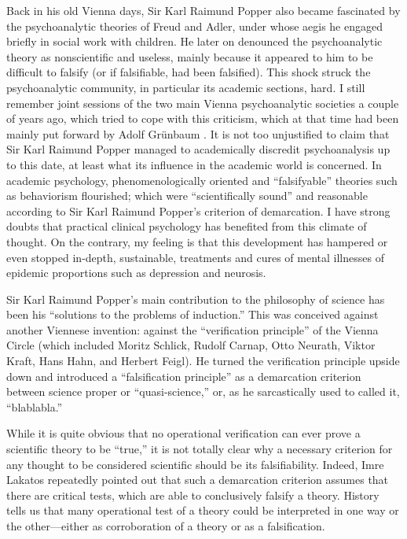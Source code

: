 Back in his old Vienna days, Sir Karl Raimund Popper
also became fascinated by the psychoanalytic theories of Freud and Adler,
under whose aegis he engaged briefly in social work with children.
He later on denounced the psychoanalytic theory as nonscientific and useless,
mainly because it appeared to him to be difficult to falsify (or if
falsifiable, had been falsified).
This shock struck the psychoanalytic community, in particular its academic sections, hard.
I still remember joint sessions of the two main Vienna psychoanalytic societies
a couple of years ago,
which tried to cope with this criticism, which at that time had been mainly put
forward by Adolf Gr\"unbaum \cite{gruenbaum-psychoanalysis}.
It is not too unjustified to claim that Sir Karl Raimund Popper managed to academically discredit
psychoanalysis up to this date, at least what its influence in the
academic world is concerned.
In academic psychology, phenomenologically oriented and ``falsifyable''
theories such as behaviorism flourished;
 which were ``scientifically sound'' and reasonable according to
Sir Karl Raimund Popper's criterion of demarcation.
I have strong doubts that practical clinical psychology has benefited from this climate of thought.
On the contrary, my feeling is that this development has hampered or even stopped
in-depth, sustainable, treatments and cures of mental illnesses
of epidemic proportions such as depression and neurosis.

Sir Karl Raimund Popper's main contribution to the philosophy of science has been his
 ``solutions to the problems of induction.''
This was conceived against another Viennese invention: against the ``verification principle''
of the Vienna Circle
(which included Moritz Schlick, Rudolf Carnap, Otto Neurath, Viktor Kraft, Hans Hahn, and Herbert Feigl).
He turned the verification principle upside down and
introduced a ``falsification  principle'' as a demarcation criterion
between science proper or ``quasi-science,'' or, as he sarcastically used to called it, ``blablabla.''

While it is quite obvious that no operational verification can ever
prove
a scientific theory to be ``true,''  it is not totally clear why a necessary
criterion for any thought to be considered scientific should be its falsifiability.
Indeed, Imre Lakatos repeatedly pointed out \cite{lakatosch} that
such a demarcation criterion assumes that there are critical tests,
which are able to conclusively falsify a theory.
History tells us that many operational test of a theory could be
interpreted in
one way or the other---either as corroboration of a theory or as a falsification.


